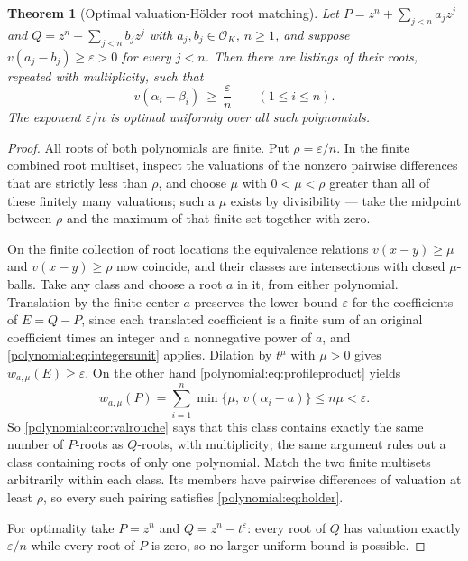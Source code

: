 \documentclass[11pt,letterpaper]{article}
\numberwithin{equation}{section}
\newtheorem{theorem}{Theorem}[section]
\theoremstyle{definition}
\theoremstyle{remark}\newtheorem{remark}[theorem]{Remark}
\newcommand{\OO}{\mathcal O}
\begin{document}
\begin{theorem}[Optimal valuation-H\"older root matching]
\label{polynomial:thm:holder}
Let $P=z^n+\sum_{j<n}a_jz^j$ and $Q=z^n+\sum_{j<n}b_jz^j$ with
$a_j,b_j\in\OO_K$, $n\ge1$, and suppose $v(a_j-b_j)\ge\varepsilon>0$ for every
$j<n$. Then there are listings of their roots, repeated with multiplicity,
such that
\begin{equation}\label{polynomial:eq:holder}
 \boxed{\displaystyle v(\alpha_i-\beta_i)\ \ge\ \frac{\varepsilon}{n}
 \qquad(1\le i\le n).}
\end{equation}
The exponent $\varepsilon/n$ is optimal uniformly over all such polynomials.
\end{theorem}
\begin{proof}
All roots of both polynomials are finite. Put $\rho=\varepsilon/n$. In the
finite combined root multiset, inspect the valuations of the nonzero pairwise
differences that are strictly less than $\rho$, and choose $\mu$ with
$0<\mu<\rho$ greater than all of these finitely many valuations; such a $\mu$
exists by divisibility --- take the midpoint between $\rho$ and the maximum of
that finite set together with zero.

On the finite collection of root locations the equivalence relations
$v(x-y)\ge\mu$ and $v(x-y)\ge\rho$ now coincide, and their classes are
intersections with closed $\mu$-balls. Take any class and choose a root $a$ in
it, from either polynomial. Translation by the finite center $a$ preserves the
lower bound $\varepsilon$ for the coefficients of $E=Q-P$, since each
translated coefficient is a finite sum of an original coefficient times an
integer and a nonnegative power of $a$, and
\eqref{polynomial:eq:integersunit} applies. Dilation by $t^\mu$ with $\mu>0$
gives $w_{a,\mu}(E)\ge\varepsilon$. On the other hand
\eqref{polynomial:eq:profileproduct} yields
\[
 w_{a,\mu}(P)=\sum_{i=1}^n\min\{\mu,\,v(\alpha_i-a)\}\le n\mu<\varepsilon .
\]
So \cref{polynomial:cor:valrouche} says that this class contains exactly the
same number of $P$-roots as $Q$-roots, with multiplicity; the same argument
rules out a class containing roots of only one polynomial. Match the two
finite multisets arbitrarily within each class. Its members have pairwise
differences of valuation at least $\rho$, so every such pairing satisfies
\eqref{polynomial:eq:holder}.

For optimality take $P=z^n$ and $Q=z^n-t^\varepsilon$: every root of $Q$ has
valuation exactly $\varepsilon/n$ while every root of $P$ is zero, so no
larger uniform bound is possible.
\end{proof}
\end{document}
